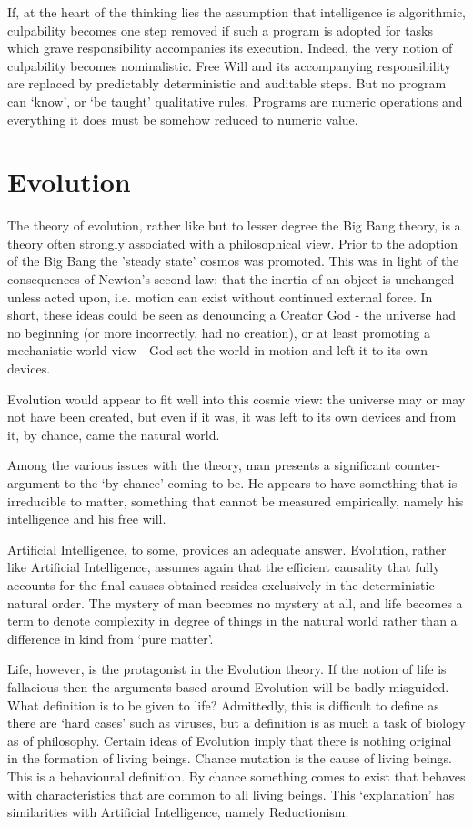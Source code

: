 \documentclass{article}
\begin{document}
If, at the heart of the thinking lies the assumption that intelligence is algorithmic, culpability becomes one step removed if such a program is adopted for tasks which grave responsibility accompanies its execution. Indeed, the very notion of culpability becomes nominalistic. Free Will and its accompanying responsibility are replaced by predictably deterministic and auditable steps. But no program can `know', or `be taught' qualitative rules. Programs are numeric operations and everything it does must be somehow reduced to numeric value.

\section*{Evolution}
The theory of evolution, rather like but to lesser degree the Big Bang theory, is a theory often strongly associated with a philosophical view. Prior to the adoption of the Big Bang the 'steady state' cosmos was promoted. This was in light of the consequences of Newton's second law: that the inertia of an object is unchanged unless acted upon, i.e. motion can exist without continued external force. In short, these ideas could be seen as denouncing a Creator God - the universe had no beginning (or more incorrectly, had no creation), or at least promoting a mechanistic world view - God set the world in motion and left it to its own devices.

Evolution would appear to fit well into this cosmic view: the universe may or may not have been created, but even if it was, it was left to its own devices and from it, by chance, came the natural world.

Among the various issues with the theory, man presents a significant counter-argument to the `by chance' coming to be. He appears to have something that is irreducible to matter, something that cannot be measured empirically, namely his intelligence and his free will.

Artificial Intelligence, to some, provides an adequate answer. Evolution, rather like Artificial Intelligence, assumes again that the efficient causality that fully accounts for the final causes obtained resides exclusively in the deterministic natural order. The mystery of man becomes no mystery at all, and life becomes a term to denote complexity in degree of things in the natural world rather than a difference in kind from `pure matter'.

Life, however, is the protagonist in the Evolution theory. If the notion of life is fallacious then the arguments based around Evolution will be badly misguided. What definition is to be given to life? Admittedly, this is difficult to define as there are `hard cases' such as viruses, but a definition is as much a task of biology as of philosophy. Certain ideas of Evolution imply that there is nothing original in the formation of living beings. Chance mutation is the cause of living beings. This is a behavioural definition. By chance something comes to exist that behaves with characteristics that are common to all living beings. This `explanation' has similarities with Artificial Intelligence, namely Reductionism.
\end{document}
